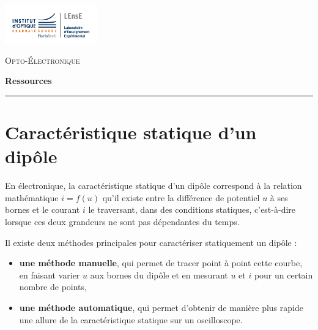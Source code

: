 \newpage
\pagestyle{empty}

\begin{minipage}[c]{.25\linewidth}
	\includegraphics[width=4cm]{images/Logo-LEnsE.png}
\end{minipage} \hfill
\begin{minipage}[c]{.4\linewidth}

\begin{center}
\vspace{0.3cm}
{\Large \textsc{Opto-Électronique}}

\medskip

\textbf{\Large Ressources}

\end{center}
\end{minipage}\hfill

\vspace{0.5cm}

\noindent \rule{\linewidth}{1pt}
\section{Caractéristique statique d'un dipôle}
\label{ressource:CaracStat}



En électronique, la caractéristique statique d'un dipôle correspond à la relation mathématique $i=f(u)$ qu'il existe entre la différence de potentiel $u$ à ses bornes et le courant $i$ le traversant, dans des conditions statiques, c'est-à-dire lorsque ces deux grandeurs ne sont pas dépendantes du temps.

\medskip

Il existe deux méthodes principales pour caractériser statiquement un dipôle :

\begin{itemize}
	\item \textbf{une méthode manuelle}, qui permet de tracer point à point cette courbe, en faisant varier $u$ aux bornes du dipôle et en mesurant $u$ et $i$ pour un certain nombre de points,
	\item \textbf{une méthode automatique}, qui permet d'obtenir de manière plus rapide une allure de la caractéristique statique sur un oscilloscope.
\end{itemize}


